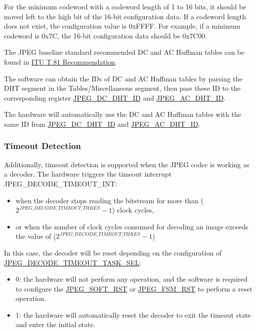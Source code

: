 \documentclass[main\_\_EN.tex]{subfiles}
\begin{document}
For the minimum codeword with a codeword length of 1 to 16 bits, it should be moved left to the high bit of the 16-bit configuration data. If a codeword length does not exist, the configuration value is 0xFFFF. For example, if a minimum codeword is 0x7C, the 16-bit configuration data should be 0x7C00.

The JPEG baseline standard recommended DC and AC Huffman tables can be found in \href{https://www.itu.int/rec/T-REC-T.81}{ITU T.81 Recommendation}.

The software can obtain the IDs of DC and AC Huffman tables by parsing the DHT segment in the Tables/Miscellaneous segment, then pass these ID to the corresponding register \hyperref[regdesc:JPEGDHTINFOREG]{JPEG\_DC\_DHT\_ID} and \hyperref[regdesc:JPEGDHTINFOREG]{JPEG\_AC\_DHT\_ID}.

The hardware will automatically use the DC and AC Huffman tables with the same ID from \hyperref[regdesc:JPEGDHTINFOREG]{JPEG\_DC\_DHT\_ID} and \hyperref[regdesc:JPEGDHTINFOREG]{JPEG\_AC\_DHT\_ID}.

\subsubsection{Timeout Detection}

Additionally, timeout detection is supported when the JPEG codec is working as a decoder. The hardware triggers the timeout interrupt JPEG\_DECODE\_TIMEOUT\_INT:
\begin{itemize}
    \item when the decoder stops reading the bitstream for more than ($ 2 ^ {\hyperref[fielddesc:JPEGDECODETIMEOUTTHRES]{JPEG\_DECODE\_TIMEOUT\_THRES}} - 1 $) clock cycles,
    \item or when the number of clock cycles consumed for decoding an image exceeds the value of ($ 2 ^ {\hyperref[fielddesc:JPEGDECODETIMEOUTTHRES]{JPEG\_DECODE\_TIMEOUT\_THRES}} - 1 $)
\end{itemize}

In this case, the decoder will be reset depending on the configuration of \hyperref[fielddesc:JPEGDECODETIMEOUTTASKSEL]{JPEG\_DECODE\_TIMEOUT\_TASK\_SEL}:
\begin{itemize}
    \item 0: the hardware will not perform any operation, and the software is required to configure the \hyperref[fielddesc:JPEGSOFTRST]{JPEG\_SOFT\_RST} or \hyperref[fielddesc:JPEGFSMRST]{JPEG\_FSM\_RST} to perform a reset operation.
    \item 1: the hardware will automatically reset the decoder to exit the timeout state and enter the initial state.
\end{itemize}
\end{document}
